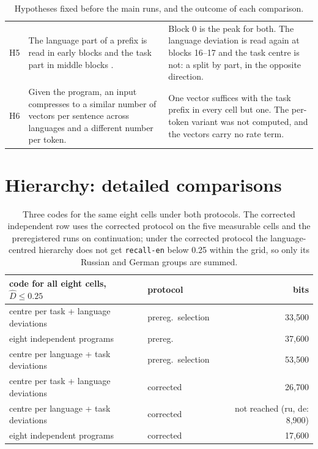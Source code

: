 \documentclass{article}
\newcommand{\Dh}{\hat D}
\newcommand{\cell}[1]{\texttt{#1}}
\begin{document}
\begin{table}[H]
\begin{tabular}{p{}p{}p{}}
H5 & The language part of a prefix is read in early blocks and the task part in middle blocks \citep{dumas2025separating}. & Block 0 is the peak for both. The language deviation is read again at blocks 16--17 and the task centre is not: a split by part, in the opposite direction. \\
H6 & Given the program, an input compresses to a similar number of vectors per sentence across languages and a different number per token. & One vector suffices with the task prefix in every cell but one. The per-token variant was not computed, and the vectors carry no rate term. \\
\bottomrule
\end{tabular}
\caption{Hypotheses fixed before the main runs, and the outcome of each comparison.}
\end{table}

\FloatBarrier
\section{Hierarchy: detailed comparisons}\label{app:hier}
\begin{table}[H]
\centering\small
\begin{tabular}{llr}
\toprule
code for all eight cells, $\Dh\le0.25$ & protocol & bits \\
\midrule
centre per task + language deviations & prereg.\ selection & 33,500 \\
eight independent programs & prereg. & 37,600 \\
centre per language + task deviations & prereg.\ selection & 53,500 \\
centre per task + language deviations & corrected & 26,700 \\
centre per language + task deviations & corrected & not reached (ru, de: 8,900) \\
eight independent programs & corrected & 17,600 \\
\bottomrule
\end{tabular}
\caption{Three codes for the same eight cells under both protocols. The corrected independent row uses the corrected protocol on the five measurable cells and the preregistered runs on continuation; under the corrected protocol the language-centred hierarchy does not get \cell{recall-en} below 0.25 within the grid, so only its Russian and German groups are summed.}
\label{tab:codes}
\end{table}
\end{document}
